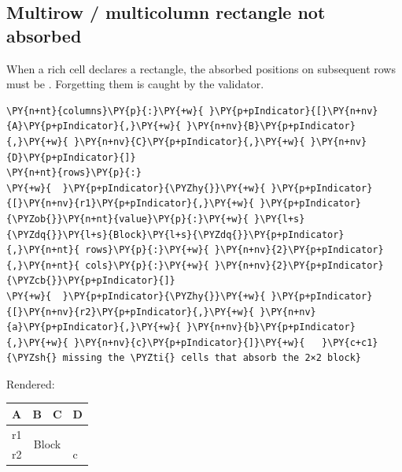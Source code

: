\documentclass[a4paper,twoside]{article}
\begin{document}
\subsection{Multirow / multicolumn rectangle not absorbed}
When a rich cell declares a rectangle, the absorbed positions on subsequent
rows must be \tscodeinline{\textasciitilde{}}. Forgetting them is caught by the validator.
\begin{tscode}[lang=yaml, engine=pygments]
\begin{Verbatim}[commandchars=\\\{\},breaklines, breakanywhere, commandchars=\\\{\}]
\PY{n+nt}{columns}\PY{p}{:}\PY{+w}{ }\PY{p+pIndicator}{[}\PY{n+nv}{A}\PY{p+pIndicator}{,}\PY{+w}{ }\PY{n+nv}{B}\PY{p+pIndicator}{,}\PY{+w}{ }\PY{n+nv}{C}\PY{p+pIndicator}{,}\PY{+w}{ }\PY{n+nv}{D}\PY{p+pIndicator}{]}
\PY{n+nt}{rows}\PY{p}{:}
\PY{+w}{  }\PY{p+pIndicator}{\PYZhy{}}\PY{+w}{ }\PY{p+pIndicator}{[}\PY{n+nv}{r1}\PY{p+pIndicator}{,}\PY{+w}{ }\PY{p+pIndicator}{\PYZob{}}\PY{n+nt}{value}\PY{p}{:}\PY{+w}{ }\PY{l+s}{\PYZdq{}}\PY{l+s}{Block}\PY{l+s}{\PYZdq{}}\PY{p+pIndicator}{,}\PY{n+nt}{ rows}\PY{p}{:}\PY{+w}{ }\PY{n+nv}{2}\PY{p+pIndicator}{,}\PY{n+nt}{ cols}\PY{p}{:}\PY{+w}{ }\PY{n+nv}{2}\PY{p+pIndicator}{\PYZcb{}}\PY{p+pIndicator}{]}
\PY{+w}{  }\PY{p+pIndicator}{\PYZhy{}}\PY{+w}{ }\PY{p+pIndicator}{[}\PY{n+nv}{r2}\PY{p+pIndicator}{,}\PY{+w}{ }\PY{n+nv}{a}\PY{p+pIndicator}{,}\PY{+w}{ }\PY{n+nv}{b}\PY{p+pIndicator}{,}\PY{+w}{ }\PY{n+nv}{c}\PY{p+pIndicator}{]}\PY{+w}{   }\PY{c+c1}{\PYZsh{} missing the \PYZti{} cells that absorb the 2×2 block}
\end{Verbatim}
\end{tscode}
Rendered:
\begin{center}
\begin{tabular}{llll}
\toprule
A & B & C & D \\
\midrule
r1 & \multicolumn{2}{c}{\multirow{2}{*}{Block}} &  \\
r2 & \multicolumn{2}{c}{} & c \\
\bottomrule
\end{tabular}
\end{center}
\end{document}
